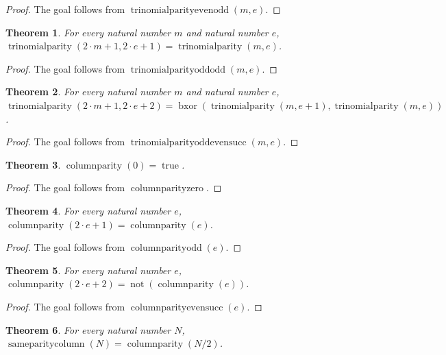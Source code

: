 \documentclass[11pt]{article}
\newtheorem{theorem}{Theorem}[section]
\theoremstyle{definition}
\begin{document}
\begin{proof}
The goal follows from \(\operatorname{trinomialparityevenodd}(m, e)\).
\end{proof}
\begin{theorem}
\label{ll:observations:trinomial-parity-odd-odd}
For every natural number \(m\) and natural number \(e\), \(\operatorname{trinomialparity}(2 \cdot m + 1, 2 \cdot e + 1) = \operatorname{trinomialparity}(m, e)\).
\end{theorem}
\begin{proof}
The goal follows from \(\operatorname{trinomialparityoddodd}(m, e)\).
\end{proof}
\begin{theorem}
\label{ll:observations:trinomial-parity-odd-even-succ}
For every natural number \(m\) and natural number \(e\), \(\operatorname{trinomialparity}(2 \cdot m + 1, 2 \cdot e + 2) = \operatorname{bxor}(\operatorname{trinomialparity}(m, e + 1), \operatorname{trinomialparity}(m, e))\).
\end{theorem}
\begin{proof}
The goal follows from \(\operatorname{trinomialparityoddevensucc}(m, e)\).
\end{proof}
\begin{theorem}
\label{ll:observations:column-parity-zero}
\(\operatorname{columnparity}(0) = \operatorname{true}\).
\end{theorem}
\begin{proof}
The goal follows from \(\operatorname{columnparityzero}\).
\end{proof}
\begin{theorem}
\label{ll:observations:column-parity-odd}
For every natural number \(e\), \(\operatorname{columnparity}(2 \cdot e + 1) = \operatorname{columnparity}(e)\).
\end{theorem}
\begin{proof}
The goal follows from \(\operatorname{columnparityodd}(e)\).
\end{proof}
\begin{theorem}
\label{ll:observations:column-parity-even-succ}
For every natural number \(e\), \(\operatorname{columnparity}(2 \cdot e + 2) = \operatorname{not}(\operatorname{columnparity}(e))\).
\end{theorem}
\begin{proof}
The goal follows from \(\operatorname{columnparityevensucc}(e)\).
\end{proof}
\begin{theorem}
\label{ll:observations:same-parity-column-eq}
For every natural number \(N\), \(\operatorname{sameparitycolumn}(N) = \operatorname{columnparity}(N / 2)\).
\end{theorem}
\end{document}
